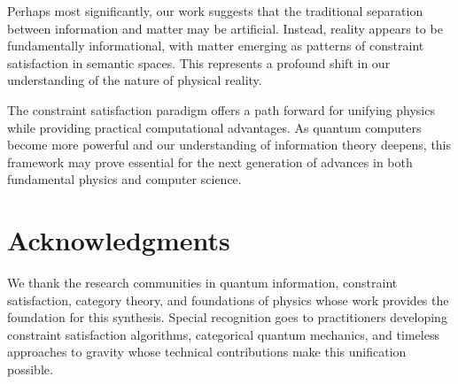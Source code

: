 \documentclass[11pt]{article}
\theoremstyle{definition}
\begin{document}
Perhaps most significantly, our work suggests that the traditional separation between information and matter may be artificial. Instead, reality appears to be fundamentally informational, with matter emerging as patterns of constraint satisfaction in semantic spaces. This represents a profound shift in our understanding of the nature of physical reality.

The constraint satisfaction paradigm offers a path forward for unifying physics while providing practical computational advantages. As quantum computers become more powerful and our understanding of information theory deepens, this framework may prove essential for the next generation of advances in both fundamental physics and computer science.

\section*{Acknowledgments}

We thank the research communities in quantum information, constraint satisfaction, category theory, and foundations of physics whose work provides the foundation for this synthesis. Special recognition goes to practitioners developing constraint satisfaction algorithms, categorical quantum mechanics, and timeless approaches to gravity whose technical contributions make this unification possible.
\end{document}
